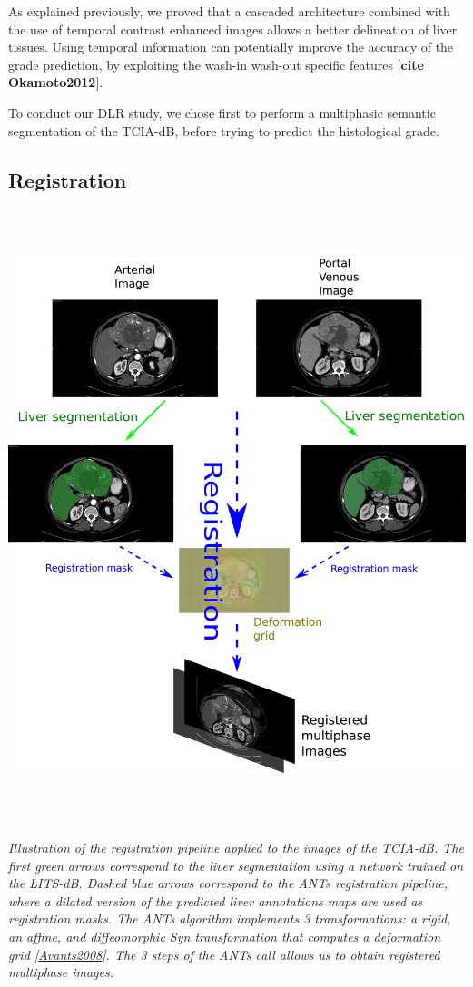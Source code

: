\documentclass[]{article}
\begin{document}
As explained previously, we proved that a cascaded architecture combined
with the use of temporal contrast enhanced images allows a better
delineation of liver tissues. Using temporal information can potentially
improve the accuracy of the grade prediction, by exploiting the wash-in
wash-out specific features {[}\textbf{cite Okamoto2012}{]}.

To conduct our DLR study, we chose first to perform a multiphasic
semantic segmentation of the TCIA-dB, before trying to predict the
histological grade.

\subsection{Registration}\label{registration}

\includegraphics[width=6.26772in,height=7.04167in]{./images/media/image24.png}

\emph{Illustration of the registration pipeline applied to the images of
the TCIA-dB. The first green arrows correspond to the liver segmentation
using a network trained on the LITS-dB. Dashed blue arrows correspond to
the ANTs registration pipeline, where a dilated version of the predicted
liver annotations maps are used as registration masks. The ANTs
algorithm implements 3 transformations: a rigid, an affine, and
diffeomorphic Syn transformation that computes a deformation grid
{[}}\href{https://sci-hub.do/10.1016/j.media.2007.06.004}{\emph{\emph{Avants2008}}}\emph{{]}.
The 3 steps of the ANTs call allows us to obtain registered multiphase
images.}
\end{document}
